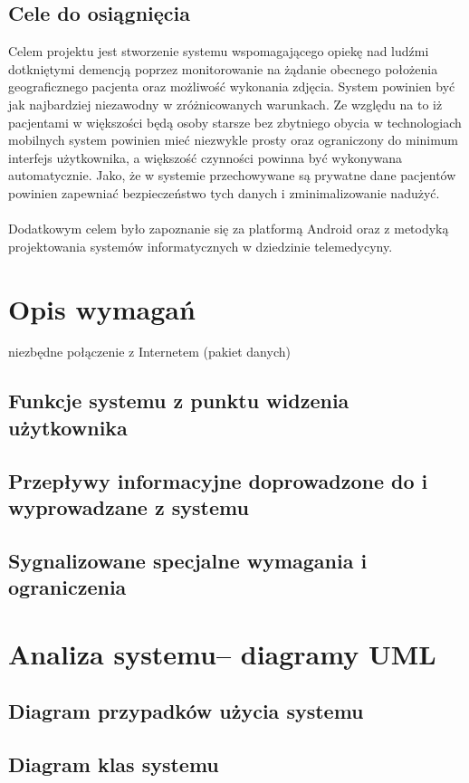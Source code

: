 \documentclass[11pt,a4paper]{article}
\begin{document}
\subsection {Cele do osiągnięcia}
Celem projektu jest stworzenie systemu wspomagającego opiekę nad ludźmi dotkniętymi demencją poprzez monitorowanie na żądanie obecnego położenia geograficznego pacjenta oraz możliwość wykonania zdjęcia. System powinien być jak najbardziej niezawodny w zróżnicowanych warunkach. Ze względu na to iż pacjentami w większości będą osoby starsze bez zbytniego obycia w technologiach mobilnych system powinien mieć niezwykle prosty oraz ograniczony do minimum interfejs użytkownika, a większość czynności powinna być wykonywana automatycznie. Jako, że w systemie przechowywane są prywatne dane pacjentów powinien zapewniać bezpieczeństwo tych danych i zminimalizowanie nadużyć.\\
\\
Dodatkowym celem było zapoznanie się za platformą Android oraz z metodyką projektowania systemów informatycznych w dziedzinie telemedycyny.
\section {Opis wymagań}
niezbędne połączenie z Internetem (pakiet danych)
\subsection {Funkcje systemu z punktu widzenia użytkownika}
\subsection {Przepływy informacyjne doprowadzone do i wyprowadzane z systemu}
\subsection {Sygnalizowane specjalne wymagania i ograniczenia}

\section {Analiza systemu– diagramy UML}
\subsection {Diagram przypadków użycia systemu}
\subsection {Diagram klas systemu}
\end{document}
